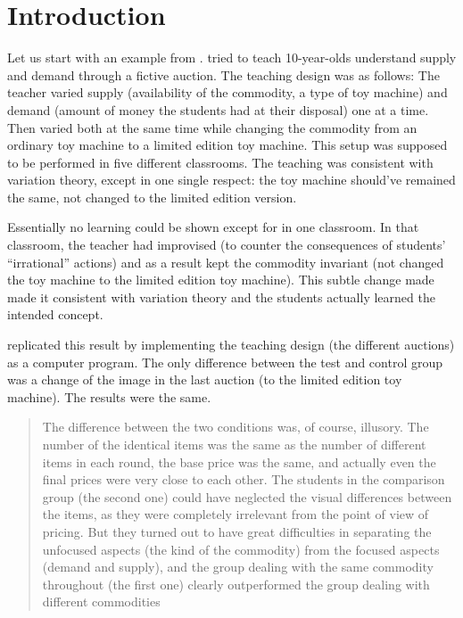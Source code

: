 \mode*

\section{Introduction}

Let us start with an example from \textcite[Ch.~7, 
p.~239]{NecessaryConditionsOfLearning}.
\Textcite{Auction10yo} tried to teach 10-year-olds understand supply and demand 
through a fictive auction.
The teaching design was as follows:
The teacher varied supply (availability of the commodity, a type of toy 
machine) and demand (amount of money the students had at their disposal) one at 
a time.
Then varied both at the same time while changing the commodity from an ordinary 
toy machine to a limited edition toy machine.
This setup was supposed to be performed in five different classrooms.
The teaching was consistent with variation theory, except in one single 
respect:
the toy machine should've remained the same, not changed to the limited edition 
version.

Essentially no learning could be shown except for in one classroom.
In that classroom, the teacher had improvised (to counter the consequences of 
students' \enquote{irrational} actions) and as a result kept the commodity 
invariant (not changed the toy machine to the limited edition toy machine).
This subtle change made made it consistent with variation theory and the 
students actually learned the intended concept.

\Textcite{AuctionReplication} replicated this result by implementing the 
teaching design (the different auctions) as a computer program.
The only difference between the test and control group was a change of the 
image in the last auction (to the limited edition toy machine).
The results were the same.
\blockquote[{\cite[pp.~240--241]{NecessaryConditionsOfLearning}}][.]{%
  The difference between the two conditions was, of course, illusory. The 
  number of the identical items was the same as the number of different items 
  in each round, the base price was the same, and actually even the final 
  prices were very close to each other. The students in the comparison group 
  (the second one) could have neglected the visual differences between the 
  items, as they were completely irrelevant from the point of view of pricing. 
  But they turned out to have great difficulties in separating the unfocused 
  aspects (the kind of the commodity) from the focused aspects (demand and 
  supply), and the group dealing with the same commodity throughout (the first 
  one) clearly outperformed the group dealing with different commodities%
}

